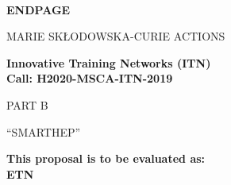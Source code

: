 \documentclass[11pt,a4paper]{article}
\def\acronym{SMARTHEP\xspace}
\begin{document}

%

\begin{center}

\mbox{ }\\[1ex
\vspace{1cm}]

{\LARGE\bf ENDPAGE}

\vspace{2.5cm}


{\LARGE MARIE SK\L ODOWSKA-CURIE ACTIONS}\\[2ex]

\vspace{2cm}

{\LARGE\bf Innovative Training Networks (ITN)\\
Call: H2020-MSCA-ITN-2019}\\[2ex]

\vspace{3.cm}

{\LARGE PART B}

\vspace{2.5cm}

{\LARGE ``\acronym'' }

\vspace{2.5cm}
 
{\large\bf This proposal is to be evaluated as:}\\
{\large\bf ETN}

\vspace{2.cm}

\end{center}
\end{document}
